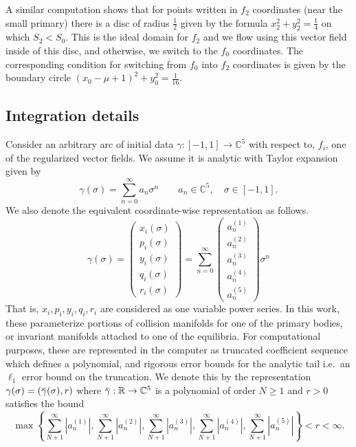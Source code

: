\documentclass[10pt]{article}
\newcommand{\rr}{\mathbb{R}}
\newcommand{\cc}{\mathbb{C}}
\newcommand{\overbar}[1]{\mkern 1.5mu\overline{\mkern-1.5mu#1\mkern-1.5mu}\mkern 1.5mu}
\newcommand{\setof}[1]{\left\{#1\right\}}
\newcommand{\abs}[1]{\left| #1 \right|}
\begin{document}
A similar computation shows that for points written in $f_2$ coordinates (near the small primary) there is a disc of radius $\frac{1}{2}$ given by the formula $x_2^2 + y_2^2 = \frac{1}{4}$ on which $S_2 < S_0$. This is the ideal domain for $f_2$ and we flow using this vector field inside of this disc, and otherwise, we switch to the $f_0$ coordinates. The corresponding condition for switching from $f_0$ into $f_2$ coordinates is given by the  boundary circle $(x_0 - \mu + 1)^2 + y_0^2 = \frac{1}{16}$. 

\subsection{Integration details}
Consider an arbitrary arc of initial data $\gamma: [-1,1] \to \cc^5$ with respect to, $f_i$, one of the regularized vector fields. We assume it is analytic with Taylor expansion given by 
\[
\gamma(\sigma) = \sum_{n = 0}^{\infty} a_n \sigma^n \qquad a_n \in \cc^5, \quad \sigma \in [-1,1].
\]
We also denote the equivalent coordinate-wise representation as follows. 
\[
\gamma(\sigma) = 
\begin{pmatrix}
x_i(\sigma) \\
p_i(\sigma) \\
y_i(\sigma) \\
q_i(\sigma) \\
r_i(\sigma)
\end{pmatrix}
=
\sum_{n = 0}^{\infty} 
\begin{pmatrix}
a^{(1)}_n \\
a^{(2)}_n \\
a^{(3)}_n \\
a^{(4)}_n\\
a^{(5)}_n
\end{pmatrix}
\sigma^n 
\]
That is, $x_i,p_i,y_i,q_i,r_i$ are considered as one variable power series. In this work, these parameterize portions of collision manifolds for one of the primary bodies, or invariant manifolds attached to one of the equilibria. For computational purposes, these are represented in the computer as truncated coefficient sequence which defines a polynomial, and rigorous error bounds for the analytic tail i.e.~an $\ell_1$ error bound on the truncation. We denote this by the representation $\gamma(\sigma) = (\overbar{\gamma}(\sigma),r)$ where $\overbar{\gamma}: \rr \to \cc^5$ is a polynomial of order $N \geq 1$ and $ r > 0$ satisfies the bound
\[
\max \setof{
\sum_{N+1}^{\infty} \abs{a^{(1)}_n}, \sum_{N+1}^{\infty} \abs{a^{(2)}_n}, \sum_{N+1}^{\infty} \abs{a^{(3)}_n}, \sum_{N+1}^{\infty} \abs{a^{(4)}_n}, \sum_{N+1}^{\infty} \abs{a^{(5)}_n}} < r < \infty. 
\]
\end{document}
